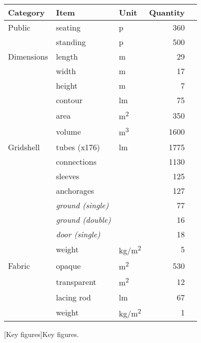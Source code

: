 \vspace{0.4cm}
\begin{table}[h]
\centering
{}
 	\begin{tabular}{@{}lllrr@{}}
	\toprule
 	Category	 	& Item 						& Unit 		& Quantity\\
	\midrule
	Public  		& seating  					& p					& 360 \\
      				& standing 					& p					& 500 \\
	\midrule
	Dimensions   	&  length						& m 					& 29	\\
	   			&  width 						& m					& 17	\\
				&  height 						& m					& 7	\\
				& contour 	 					& lm					& 75\\
				& area						& m\textsuperscript{2}	& 350\\
				&  volume						& m\textsuperscript{3}	& 1600 \\
	\midrule
	Gridshell   	&  tubes (x176)					& lm					& 1775 \\
	   			&  connections					& 					& 1130 \\
				&  sleeves						& 					& 125 \\
				& anchorages 					& 					& 127 \\
				& \quad \emph{ground (single)} 	& 					& 77 \\
				& \quad \emph{ground (double)} 	& 					& 16 \\
				& \quad \emph{door (single)} 		& 					& 18 \\
				& weight  						& kg/m\textsuperscript{2} 	& 5 \\
	\midrule
	Fabric   		& opaque						& m\textsuperscript{2}	 & 530 \\
	   			& transparent					& m\textsuperscript{2}	& 12 \\
				& lacing rod					& lm 				 	& 67 \\
				& weight						& kg/m\textsuperscript{2}	& 1 \\
	\bottomrule
 	\end{tabular}
[Key figures]{Key figures.}
\end{table}

